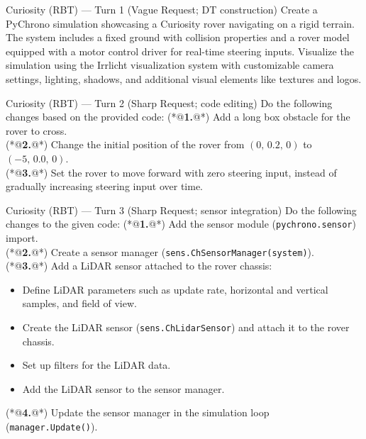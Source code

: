 \begin{PromptBlock}{Curiosity (RBT) --- Turn 1 (Vague Request; DT construction)}
    Create a PyChrono simulation showcasing a Curiosity rover navigating on a rigid terrain.
    The system includes a fixed ground with collision properties and a rover model equipped with a motor control driver for real-time steering inputs.
    Visualize the simulation using the Irrlicht visualization system with customizable camera settings, lighting, shadows, and additional visual elements like textures and logos.
    \end{PromptBlock}
    
    \begin{PromptBlock}{Curiosity (RBT) --- Turn 2 (Sharp Request; code editing)}
    Do the following changes based on the provided code:
    (*@\textbf{1.}@*) Add a long box obstacle for the rover to cross.\\
    (*@\textbf{2.}@*) Change the initial position of the rover from $(0,\,0.2,\,0)$ to $(-5,\,0.0,\,0)$.\\
    (*@\textbf{3.}@*) Set the rover to move forward with zero steering input, instead of gradually increasing steering input over time.
    \end{PromptBlock}
    
    \begin{PromptBlock}{Curiosity (RBT) --- Turn 3 (Sharp Request; sensor integration)}
    Do the following changes to the given code:
    (*@\textbf{1.}@*) Add the sensor module (\texttt{pychrono.sensor}) import.\\
    (*@\textbf{2.}@*) Create a sensor manager (\texttt{sens.ChSensorManager(system)}).\\
    (*@\textbf{3.}@*) Add a LiDAR sensor attached to the rover chassis:
    \begin{itemize}
      \item Define LiDAR parameters such as update rate, horizontal and vertical samples, and field of view.
      \item Create the LiDAR sensor (\texttt{sens.ChLidarSensor}) and attach it to the rover chassis.
      \item Set up filters for the LiDAR data.
      \item Add the LiDAR sensor to the sensor manager.
    \end{itemize}
    (*@\textbf{4.}@*) Update the sensor manager in the simulation loop (\texttt{manager.Update()}).
    \end{PromptBlock}
    
